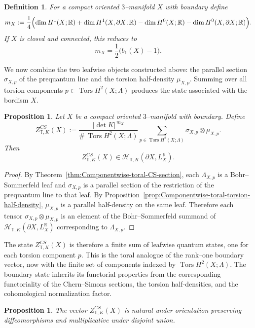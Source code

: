 \documentclass[12pt]{amsart}
\numberwithin{equation}{section}
\newtheorem{prop}[theorem]{Proposition}
\newtheorem{definition}[theorem]{Definition}
\DeclareMathOperator{\Tors}{Tors}
\begin{document}
\begin{definition}
\label{def:toral-normalization-exponent}
For a compact oriented $3$--manifold $X$ with boundary define
\[
m_X
:=
\frac14\Bigl(
\dim H^1(X;\mathbb R)
+\dim H^1(X,\partial X;\mathbb R)
-\dim H^0(X;\mathbb R)
-\dim H^0(X,\partial X;\mathbb R)
\Bigr).
\]
If $X$ is closed and connected, this reduces to
\[
m_X=\frac12\bigl(b_1(X)-1\bigr).
\]
\end{definition}

We now combine the two leafwise objects constructed above: the parallel section \(\sigma_{X,p}\) of the prequantum line and the torsion half-density \(\mu_{X,p}\). Summing over all torsion components \(p\in \Tors H^2(X;\Lambda)\) produces the state associated with the bordism \(X\).

\begin{prop}
\label{def:canonical-toral-boundary-vector}
Let $X$ be a compact oriented $3$--manifold with boundary.
Define
\[
Z^{CS}_{\mathbb T,K}(X)
:=
\frac{|\det K|^{\,m_X}}{\#\,\Tors H^2(X;\Lambda)}
\sum_{p\in \Tors H^2(X;\Lambda)}
\sigma_{X,p}\otimes \mu_{X,p}.
\]
Then
\[
Z^{CS}_{\mathbb T,K}(X)\in
\mathcal H_{\mathbb T,K}(\partial X,L_X^{\mathbb R}).
\]
\end{prop}

\begin{proof}
By Theorem~\ref{thm:Componentwise-toral-CS-section}, each $\Lambda_{X,p}$ is a
Bohr--Sommerfeld leaf and $\sigma_{X,p}$ is a parallel section of the
restriction of the prequantum line to that leaf.
By Proposition~\ref{prop:Componentwise-toral-torsion-half-density},
$\mu_{X,p}$ is a parallel half-density on the same leaf.
Therefore each tensor
$\sigma_{X,p}\otimes \mu_{X,p}$ is an element of the Bohr--Sommerfeld summand of
$\mathcal H_{\mathbb T,K}(\partial X,L_X^{\mathbb R})$ corresponding to
$\Lambda_{X,p}$.
\end{proof}


The state \(Z^{CS}_{\mathbb T,K}(X)\) is therefore a finite sum of leafwise quantum
states, one for each torsion component \(p\). This is the toral analogue of the
rank--one boundary vector, now with the finite set of components indexed by
\(\Tors H^2(X;\Lambda)\).
The boundary state inherits its functorial properties from the corresponding functoriality of the
Chern--Simons sections, the torsion half-densities, and the cohomological normalization factor.

\begin{prop}
\label{prop:toral-boundary-vector-functoriality}
The vector $Z^{CS}_{\mathbb T,K}(X)$ is natural under orientation-preserving
diffeomorphisms and multiplicative under disjoint union.
\end{prop}
\end{document}
